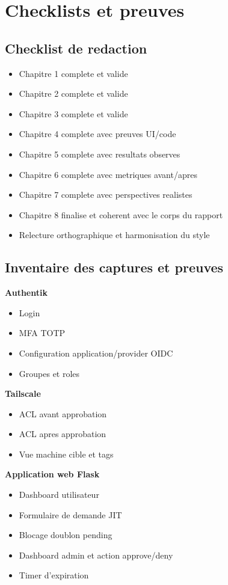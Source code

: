 \chapter{Checklists et preuves}

\section{Checklist de redaction}
\begin{itemize}
	\item [ ] Chapitre 1 complete et valide
	\item [ ] Chapitre 2 complete et valide
	\item [ ] Chapitre 3 complete et valide
	\item [ ] Chapitre 4 complete avec preuves UI/code
	\item [ ] Chapitre 5 complete avec resultats observes
	\item [ ] Chapitre 6 complete avec metriques avant/apres
	\item [ ] Chapitre 7 complete avec perspectives realistes
	\item [ ] Chapitre 8 finalise et coherent avec le corps du rapport
	\item [ ] Relecture orthographique et harmonisation du style
\end{itemize}

\section{Inventaire des captures et preuves}
\textbf{Authentik}
\begin{itemize}
	\item [ ] Login
	\item [ ] MFA TOTP
	\item [ ] Configuration application/provider OIDC
	\item [ ] Groupes et roles
\end{itemize}

\textbf{Tailscale}
\begin{itemize}
	\item [ ] ACL avant approbation
	\item [ ] ACL apres approbation
	\item [ ] Vue machine cible et tags
\end{itemize}

\textbf{Application web Flask}
\begin{itemize}
	\item [ ] Dashboard utilisateur
	\item [ ] Formulaire de demande JIT
	\item [ ] Blocage doublon pending
	\item [ ] Dashboard admin et action approve/deny
	\item [ ] Timer d'expiration
\end{itemize}

